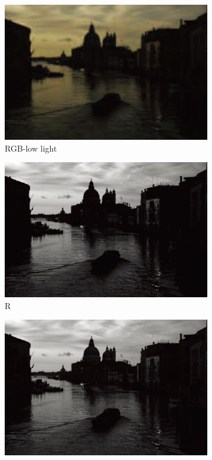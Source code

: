 \documentclass[letterpaper,10pt]{article}
\begin{document}
\begin{figure}[htbp]
				\begin{subfigure}{0.11\textwidth}
					\includegraphics[width=\linewidth]{picture/LLIE/Division Gets Better/RGB-low light3}
					\captionsetup{font=scriptsize}
					\caption*{RGB-low light}
					\label{fig: RGB-low light3}
				\end{subfigure}
				\begin{subfigure}{0.11\textwidth}
					\includegraphics[width=\linewidth]{picture/LLIE/Division Gets Better/R3}
					\captionsetup{font=scriptsize}
					\caption*{R}
					\label{fig: R3}
				\end{subfigure}
				\begin{subfigure}{0.11\textwidth}
					\includegraphics[width=\linewidth]{picture/LLIE/Division Gets Better/G3}

\end{subfigure}
\end{figure}
\end{document}
